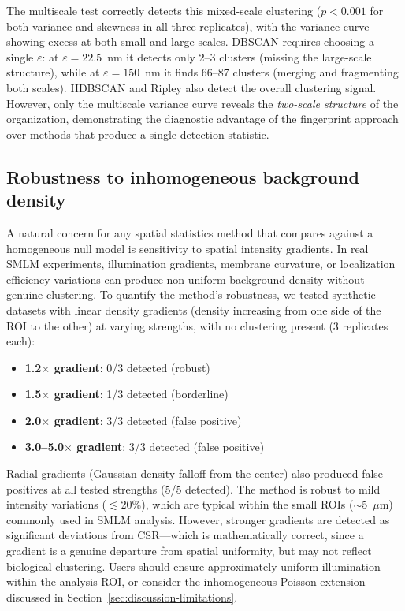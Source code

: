 \documentclass[11pt]{article}
\begin{document}
The multiscale test correctly detects this mixed-scale clustering
($p < 0.001$ for both variance and skewness in all three replicates),
with the variance curve showing excess at both small and large scales.
DBSCAN requires choosing a single $\varepsilon$: at $\varepsilon = 22.5$~nm
it detects only 2--3 clusters (missing the large-scale structure), while
at $\varepsilon = 150$~nm it finds 66--87 clusters (merging and
fragmenting both scales). HDBSCAN and Ripley also detect the overall
clustering signal. However, only the multiscale variance curve reveals
the \emph{two-scale structure} of the organization, demonstrating the
diagnostic advantage of the fingerprint approach over methods that
produce a single detection statistic.

\subsection{Robustness to inhomogeneous background density}
\label{sec:gradient}

A natural concern for any spatial statistics method that compares against
a homogeneous null model is sensitivity to spatial intensity gradients.
In real SMLM experiments, illumination gradients, membrane curvature, or
localization efficiency variations can produce non-uniform background
density without genuine clustering. To quantify the method's robustness,
we tested synthetic datasets with linear density gradients (density
increasing from one side of the ROI to the other) at varying strengths,
with no clustering present (3 replicates each):

\begin{itemize}
  \item \textbf{1.2$\times$ gradient}: 0/3 detected (robust)
  \item \textbf{1.5$\times$ gradient}: 1/3 detected (borderline)
  \item \textbf{2.0$\times$ gradient}: 3/3 detected (false positive)
  \item \textbf{3.0--5.0$\times$ gradient}: 3/3 detected (false positive)
\end{itemize}

Radial gradients (Gaussian density falloff from the center) also produced
false positives at all tested strengths (5/5 detected). The method is
robust to mild intensity variations ($\lesssim$20\%), which are typical
within the small ROIs ($\sim$5~$\mu$m) commonly used in SMLM analysis.
However, stronger gradients are detected as significant deviations from
CSR---which is mathematically correct, since a gradient is a genuine
departure from spatial uniformity, but may not reflect biological
clustering. Users should ensure approximately uniform illumination within
the analysis ROI, or consider the inhomogeneous Poisson extension
discussed in Section~\ref{sec:discussion-limitations}.
\end{document}
